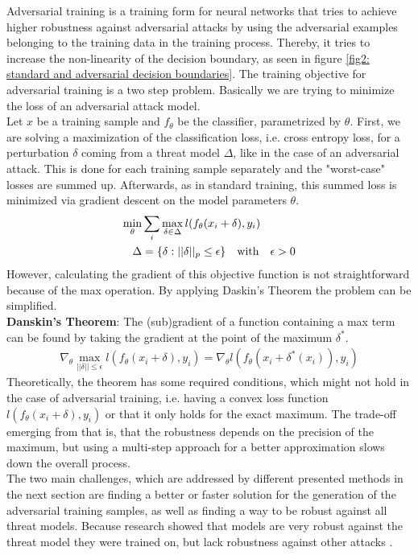 \documentclass{article}
\begin{document}
Adversarial training is a training form for neural networks that tries to achieve higher robustness against adversarial attacks by using the adversarial examples belonging to the training data in the training process. Thereby, it tries to increase the non-linearity of the decision boundary, as seen in figure \ref{fig2: standard and adversarial decision boundaries}. The training objective for adversarial training is a two step problem. Basically we are trying to minimize the loss of an adversarial attack model. \\
Let $x$ be a training sample and $f_{\theta}$ be the classifier, parametrized by $\theta$. First, we are solving a maximization of the classification loss, i.e. cross entropy loss, for a perturbation $\delta$ coming from a threat model $\Delta$, like in the case of an adversarial attack. This is done for each training sample separately and the "worst-case" losses are summed up. Afterwards, as in standard training, this summed loss is minimized via gradient descent on the model parameters $\theta$. 
\vspace{-0.2cm}
\begin{align}
  \label{eqn:saddle}
  \min_{\theta} & \sum_i \max_{\delta \in \Delta} \space l(f_{\theta}(x_i + \delta), y_i)  \\
  \Delta & = \{\delta : ||\delta||_p \leq \epsilon\} \quad \text{with} \quad \epsilon > 0
\end{align}
However, calculating the gradient of this objective function is not straightforward because of the max operation. By applying Daskin's Theorem the problem can be simplified. \\
\textbf{Danskin's Theorem}: The (sub)gradient of a function containing a max term can be found by taking the gradient at the point of the maximum $\delta^{*}$.
\begin{align*}
  \nabla_{\theta} \max_{||\delta|| \leq \epsilon} l(f_{\theta}(x_i + \delta), y_i) = \nabla_{\theta} l(f_{\theta}(x_i + \delta^{*}(x_i)), y_i)
\end{align*}
Theoretically, the theorem has some required conditions, which might not hold in the case of adversarial training, i.e. having a convex loss function $l(f_{\theta}(x_i + \delta), y_i)$ or that it only holds for the exact maximum. The trade-off emerging from that is, that the robustness depends on the precision of the maximum, but using a multi-step approach for a better approximation slows down the overall process. \\
The two main challenges, which are addressed by different presented methods in the next section are finding a better or faster solution for the generation of the adversarial training samples, as well as finding a way to be robust against all threat models. Because research showed that models are very robust against the threat model they were trained on, but lack robustness against other attacks \cite{b7, b8}.
  
\end{document}
